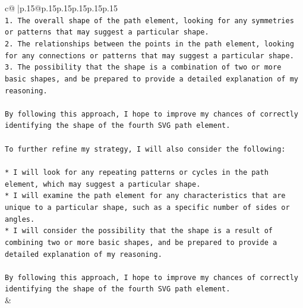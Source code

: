 \documentclass{article}
\begin{document}
{\begin{supertabular}{c@{$\;$}|p{.15\linewidth}@{}p{.15\linewidth}p{.15\linewidth}p{.15\linewidth}p{.15\linewidth}p{.15\linewidth}}
{{{\\ 
\texttt{1. The overall shape of the path element, looking for any symmetries or patterns that may suggest a particular shape.} \\
\texttt{2. The relationships between the points in the path element, looking for any connections or patterns that may suggest a particular shape.} \\
\texttt{3. The possibility that the shape is a combination of two or more basic shapes, and be prepared to provide a detailed explanation of my reasoning.} \\
\\ 
\texttt{By following this approach, I hope to improve my chances of correctly identifying the shape of the fourth SVG path element.} \\
\\ 
\texttt{To further refine my strategy, I will also consider the following:} \\
\\ 
\texttt{* I will look for any repeating patterns or cycles in the path element, which may suggest a particular shape.} \\
\texttt{* I will examine the path element for any characteristics that are unique to a particular shape, such as a specific number of sides or angles.} \\
\texttt{* I will consider the possibility that the shape is a result of combining two or more basic shapes, and be prepared to provide a detailed explanation of my reasoning.} \\
\\ 
\texttt{By following this approach, I hope to improve my chances of correctly identifying the shape of the fourth SVG path element.} \\
            }
        }
    }
    & \\ \\

\end{supertabular}
}
\end{document}
